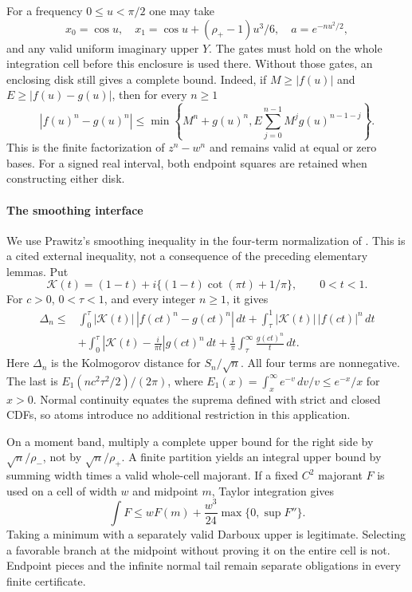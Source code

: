 For a frequency $0\le u<\pi/2$ one may take
\[
 x_0=\cos u,\quad x_1=\cos u+(\rho_+-1)u^3/6,\quad
 a=e^{-nu^2/2},
\]
and any valid uniform imaginary upper $Y$. The gates must hold on the
whole integration cell before this enclosure is used there.
Without those gates, an enclosing disk still gives a complete bound.
Indeed, if $M\ge|f(u)|$ and $E\ge|f(u)-g(u)|$, then for every $n\ge1$
\begin{equation}\label{ms:fourier:afcore:eq:telescoper}
 |f(u)^n-g(u)^n|
 \le\min\left\{M^n+g(u)^n,
 E\sum_{j=0}^{n-1}M^jg(u)^{n-1-j}\right\}.
\end{equation}
This is the finite factorization of $z^n-w^n$ and remains valid at equal
or zero bases. For a signed real interval, both endpoint squares are
retained when constructing either disk.

\paragraph{The smoothing interface}

We use Prawitz's smoothing inequality in the four-term normalization
of \cite[Lemma~4.1, p.~263]{Shevtsova2012}. This is a cited external inequality,
not a consequence of the preceding elementary lemmas. Put
\[
 \mathcal K(t)=(1-t)+i\{(1-t)\cot(\pi t)+1/\pi\},\qquad0<t<1.
\]
For $c>0$, $0<\tau<1$, and every integer $n\ge1$, it gives
\begin{align}
 \Delta_n\le{}&
 \int_0^\tau |\mathcal K(t)|\,
             |f(ct)^n-g(ct)^n|\,dt
 +\int_\tau^1|\mathcal K(t)|\,|f(ct)|^n\,dt\nonumber\\
 &+\int_0^\tau\left|\mathcal K(t)-\frac{i}{\pi t}\right|
                    g(ct)^n\,dt
 +\frac1\pi\int_\tau^\infty\frac{g(ct)^n}{t}\,dt.
 \label{ms:fourier:afcore:eq:prawitz}
\end{align}
Here $\Delta_n$ is the Kolmogorov distance for $S_n/\sqrt n$.
All four terms are nonnegative. The last is
$E_1(nc^2\tau^2/2)/(2\pi)$, where
$E_1(x)=\int_x^\infty e^{-v}\,dv/v\le e^{-x}/x$ for $x>0$.
Normal continuity equates the suprema defined with strict and closed
CDFs, so atoms introduce no additional restriction in this application.

On a moment band, multiply a complete upper bound for the right side
by $\sqrt n/\rho_-$, not by $\sqrt n/\rho_+$.
A finite partition yields an integral upper bound by summing width
times a valid whole-cell majorant. If a fixed $C^2$ majorant $F$ is
used on a cell of width $w$ and midpoint $m$, Taylor integration gives
\[
 \int F\le wF(m)+\frac{w^3}{24}\max\{0,\sup F''\}.
\]
Taking a minimum with a separately valid Darboux upper is legitimate.
Selecting a favorable branch at the midpoint without proving it on
the entire cell is not. Endpoint pieces and the infinite normal tail
remain separate obligations in every finite certificate.

